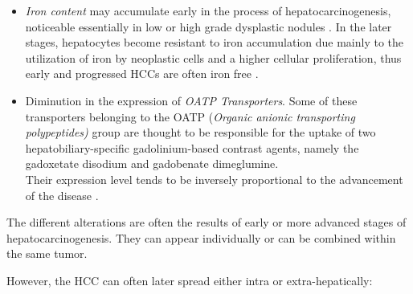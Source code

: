 \begin{itemize}
\item
  \emph{Iron content} may accumulate early in the process of
  hepatocarcinogenesis, noticeable essentially in low or high grade
  dysplastic nodules \cite{Kojiro2009}. In the later
  stages, hepatocytes become resistant to iron accumulation due mainly
  to the utilization of iron by neoplastic cells and a higher cellular
  proliferation, thus early and progressed HCCs are often iron free
  \cite{Gurusamy2007}.
\item
  Diminution in the expression of \emph{	OATP Transporters}. Some of
  these transporters belonging to the OATP (\emph{Organic anionic
    transporting polypeptides)} group are thought to be responsible for
  the uptake of two hepatobiliary-specific gadolinium-based contrast
  agents, namely the gadoxetate disodium and gadobenate dimeglumine.\\
  Their expression level tends to be inversely proportional to the
  advancement of the disease \cite{Kitao2011,Tsuboyama2010}.
\end{itemize}

The different alterations are often the results of early or more
advanced stages of hepatocarcinogenesis. They can appear individually or
can be combined within the same tumor.

However, the HCC can often later spread either intra or
extra-hepatically:

